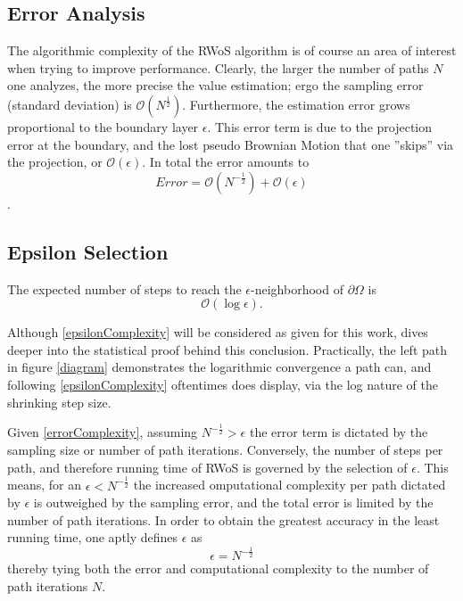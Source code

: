 \subsection{Error Analysis}\label{errorAnal}
The algorithmic complexity of the \Gls{RWoS} algorithm is of course an area of interest
when trying to improve performance. Clearly, the larger the number of paths $N$ one
analyzes, the more precise the value estimation; ergo the sampling error (standard deviation)
is $\mathcal{O}(N^{\frac{1}{2}})$. Furthermore, the estimation error grows proportional to
the boundary layer $\epsilon$.
This error term is due to the projection error at the boundary, and the lost
pseudo Brownian Motion that one ''skips'' via the projection, or  $\mathcal{O}(\epsilon)$.
In total the error amounts to $$Error = \mathcal{O}(N^{-\frac{1}{2}}) + \mathcal{O}(\epsilon)$$\cite{Bornemann}\label{errorComplexity}.

\subsection{Epsilon Selection}
\begin{theorem}
The expected number of steps to reach the $\epsilon$-neighborhood of $\partial\Omega$
is $$\mathcal{O}(\log{}\epsilon).$$\cite{Bornemann,DeLaurentis}\label{epsilonComplexity}
\end{theorem}

Although \ref{epsilonComplexity} will be considered as given for this work, \cite{DeLaurentis}
dives deeper into the statistical proof behind this conclusion.  Practically, the
 left path in figure \ref{diagram} demonstrates the logarithmic convergence a path
 can, and following \ref{epsilonComplexity} oftentimes does display, via the log
 nature of the shrinking step size.

 Given \ref{errorComplexity}, assuming $N^{-\frac{1}{2}} > \epsilon$ the error term
 is dictated by the sampling size or number of path iterations.  Conversely, the number of steps per path,
 and therefore running time of \Gls{RWoS} is governed by the selection of $\epsilon$.
 This means, for an $\epsilon < N^{-\frac{1}{2}}$ the increased omputational complexity
 per path dictated by $\epsilon$ is outweighed by the sampling error, and the total error is limited
 by the number of path iterations.  In order to obtain the greatest accuracy in
 the least running time, one aptly defines $\epsilon$ as $$\epsilon = N^{-\frac{1}{2}}$$\label{epsilonDefinition}
 thereby tying both the error and computational complexity to the number of path
  iterations $N$\cite{Bornemann}.

